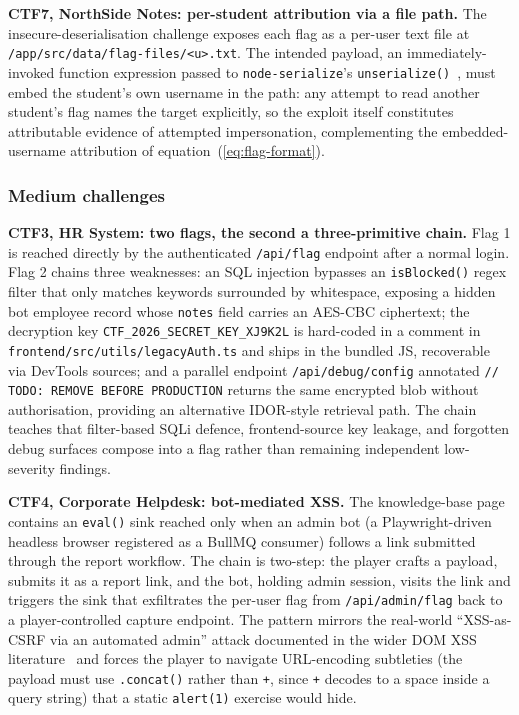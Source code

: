 \textbf{CTF7, NorthSide Notes: per-student attribution
via a file path.} The insecure-deserialisation challenge
exposes each flag as a per-user text file at
\texttt{/app/src/data/flag-files/<u>.txt}. The intended
payload, an immediately-invoked function expression passed
to \texttt{node-serialize}'s
\texttt{unserialize()}~\cite{CVE20175941,NodeSerialize},
must embed the student's own username in the path: any
attempt to read another student's flag names the target
explicitly, so the exploit itself constitutes attributable
evidence of attempted impersonation, complementing the
embedded-username attribution of
equation~(\ref{eq:flag-format}).

\subsubsection{Medium challenges}

\textbf{CTF3, HR System: two flags, the second a
three-primitive chain.} Flag 1 is reached directly by the
authenticated \texttt{/api/flag} endpoint after a normal
login. Flag 2 chains three weaknesses: an SQL
injection bypasses an
\texttt{isBlocked()} regex filter that only matches keywords
surrounded by whitespace, exposing a hidden bot employee
record whose \texttt{notes} field carries an AES-CBC
ciphertext; the decryption key
\texttt{CTF\_2026\_SECRET\_KEY\_XJ9K2L} is hard-coded in a
comment in \texttt{frontend/src/utils/legacyAuth.ts} and
ships in the bundled JS, recoverable via DevTools sources;
and a parallel endpoint \texttt{/api/debug/config}
annotated \texttt{// TODO: REMOVE BEFORE PRODUCTION} returns
the same encrypted blob without authorisation, providing an
alternative IDOR-style retrieval path. The chain teaches
that filter-based SQLi defence, frontend-source key leakage,
and forgotten debug surfaces compose into a flag rather than
remaining independent low-severity findings.

\textbf{CTF4, Corporate Helpdesk: bot-mediated XSS.}
The knowledge-base page contains an \texttt{eval()} sink
reached only when an admin bot (a Playwright-driven headless
browser registered as a BullMQ consumer) follows a link
submitted through the report workflow. The chain is two-step:
the player crafts a payload, submits it as a report link, and
the bot, holding admin session, visits the link and
triggers the sink that exfiltrates the per-user flag from
\texttt{/api/admin/flag} back to a player-controlled capture
endpoint. The pattern mirrors the real-world ``XSS-as-CSRF via
an automated admin'' attack documented in the wider DOM XSS
literature~\cite{DOMXSSWalker2023} and forces
the player to navigate URL-encoding subtleties (the payload
must use \texttt{.concat()} rather than \texttt{+}, since
\texttt{+} decodes to a space inside a query string) that a
static \texttt{alert(1)} exercise would hide.


